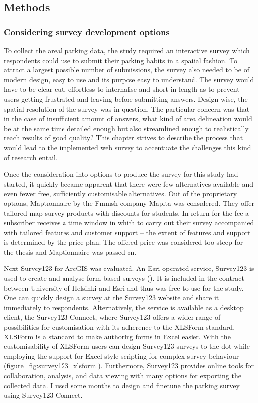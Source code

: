 \newpage
\subsection{Methods}
\subsubsection{Considering survey development options}
\justify

To collect the areal parking data, the study required an interactive survey which respondents could use to submit their parking habits in a spatial fashion. To attract a largest possible number of submissions, the survey also needed to be of modern design, easy to use and its purpose easy to understand. The survey would have to be clear-cut, effortless to internalise and short in length as to prevent users getting frustrated and leaving before submitting answers. Design-wise, the spatial resolution of the survey was in question. The particular concern was that in the case of insufficient amount of answers, what kind of area delineation would be at the same time detailed enough but also streamlined enough to realistically reach results of good quality? This chapter strives to describe the process that would lead to the implemented web survey to accentuate the challenges this kind of research entail.

Once the consideration into options to produce the survey for this study had started, it quickly became apparent that there were few alternatives available and even fewer free, sufficiently customisable alternatives. Out of the proprietary options, Maptionnaire by the Finnish company Mapita was considered. They offer tailored map survey products with discounts for students. In return for the fee a subscriber receives a time window in which to carry out their survey accompanied with tailored features and customer support -- the extent of features and support is determined by the price plan. The offered price was considered too steep for the thesis and Maptionnaire was passed on. 

Next Survey123 for ArcGIS was evaluated. An Esri operated service, Survey123 is used to create and analyse form based surveys (\cite{Esri}). It is included in the contract between University of Helsinki and Esri and thus was free to use for the study. One can quickly design a survey at the Survey123 website and share it immediately to respondents. Alternatively, the service is available as a desktop client, the Survey123 Connect, where Survey123 offers a wider range of possibilities for customisation with its adherence to the XLSForm standard. XLSForm is a standard to make authoring forms in Excel easier. With the customisability of XLSForm users can design Survey123 surveys to the dot while employing the support for Excel style scripting for complex survey behaviour (figure~\ref{fig:survey123_xlsform}). Furthermore, Survey123 provides online tools for collaboration, analysis, and data viewing with many options for exporting the collected data. I used some months to design and finetune the parking survey using Survey123 Connect. 

